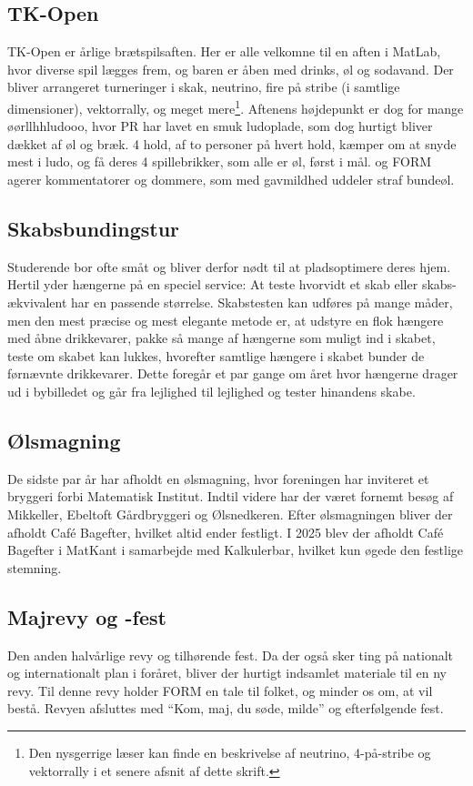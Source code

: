 \subsection{TK-Open}
TK-Open er \TKETs årlige brætspilsaften. Her er alle velkomne til en aften i MatLab, hvor diverse spil lægges frem, og baren er åben med drinks, øl og sodavand. Der bliver arrangeret turneringer i skak, neutrino, fire på stribe (i samtlige dimensioner), vektorrally, og meget mere\footnote{Den nysgerrige læser kan finde en beskrivelse af neutrino, 4-på-stribe og vektorrally i et senere afsnit af dette skrift.}. Aftenens højdepunkt er dog for mange øørllhhludooo, hvor PR har lavet en smuk ludoplade, som dog hurtigt bliver dækket af øl og bræk. 4 hold, af to personer på hvert hold, kæmper om at snyde mest i ludo, og få deres 4 spillebrikker, som alle er øl, først i mål. \CERM og FORM agerer kommentatorer og dommere, som med gavmildhed uddeler straf bundeøl.

\subsection{Skabsbundingstur}
Studerende bor ofte småt og bliver derfor nødt til at pladsoptimere deres hjem. Hertil yder hængerne på \TKET en speciel service: At teste hvorvidt et skab eller skabs-ækvivalent har en passende størrelse. Skabstesten kan udføres på mange måder, men den mest præcise og mest elegante metode er, at udstyre en flok hængere med åbne drikkevarer, pakke så mange af hængerne som muligt ind i skabet, teste om skabet kan lukkes, hvorefter samtlige hængere i skabet bunder de førnævnte drikkevarer. Dette foregår et par gange om året hvor hængerne drager ud i bybilledet og går fra lejlighed til lejlighed og tester hinandens skabe.

\subsection{Ølsmagning}
De sidste par år har \TKET afholdt en ølsmagning, hvor foreningen har inviteret et bryggeri forbi Matematisk Institut. Indtil videre har der været fornemt besøg af Mikkeller, Ebeltoft Gårdbryggeri og Ølsnedkeren. Efter ølsmagningen bliver der afholdt Café Bagefter, hvilket altid ender festligt. I 2025 blev der afholdt Café Bagefter i MatKant i samarbejde med Kalkulerbar, hvilket kun øgede den festlige stemning. 

\subsection{Majrevy og -fest}
Den anden halvårlige revy og tilhørende fest. Da der også sker ting på nationalt og internationalt plan i foråret, bliver der hurtigt indsamlet materiale til en ny revy. Til denne revy holder FORM en tale til folket, og minder os om, at \TKET vil bestå. Revyen afsluttes med ``Kom, maj, du søde, milde'' og efterfølgende fest.

